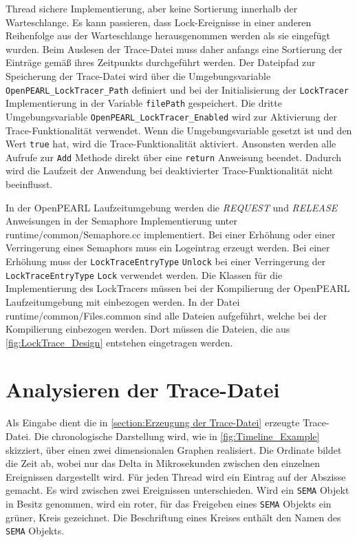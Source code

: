 Thread sichere Implementierung, aber keine Sortierung innerhalb der
Warteschlange. Es kann passieren, dass Lock-Ereignisse in einer anderen
Reihenfolge aus der Warteschlange herausgenommen werden als sie eingefügt
wurden. Beim Auslesen der Trace-Datei muss daher anfangs eine Sortierung der
Einträge gemäß ihres Zeitpunkts durchgeführt werden. Der Dateipfad zur
Speicherung der Trace-Datei wird über die Umgebungsvariable
\texttt{OpenPEARL\_LockTracer\_Path} definiert und bei der Initialisierung der
\texttt{LockTracer} Implementierung in der Variable \texttt{filePath}
gespeichert. Die dritte Umgebungsvariable
\texttt{OpenPEARL\_LockTracer\_Enabled} wird zur Aktivierung der
Trace-Funktionalität verwendet. Wenn die Umgebungsvariable gesetzt ist und den
Wert \texttt{true} hat, wird die Trace-Funktionalität aktiviert. Ansonsten
werden alle Aufrufe zur \texttt{Add} Methode direkt über eine \texttt{return}
Anweisung beendet. Dadurch wird die Laufzeit der Anwendung bei deaktivierter
Trace-Funktionalität nicht beeinflusst.

In der OpenPEARL Laufzeitumgebung werden die \textit{REQUEST} und
\textit{RELEASE} Anweisungen in der Semaphore Implementierung unter
runtime/common/Semaphore.cc implementiert. Bei einer Erhöhung oder einer
Verringerung eines Semaphors muss ein Logeintrag erzeugt werden. Bei einer
Erhöhung muss der \texttt{LockTraceEntryType} \texttt{Unlock} bei einer
Verringerung der \texttt{LockTraceEntryType} \texttt{Lock} verwendet werden. Die
Klassen für die Implementierung des LockTracers müssen bei der Kompilierung der
OpenPEARL Laufzeitumgebung mit einbezogen werden. In der Datei
runtime/common/Files.common sind alle Dateien aufgeführt, welche bei der
Kompilierung einbezogen werden. Dort müssen die Dateien, die aus
\cref{fig:LockTrace_Design} entstehen eingetragen werden.

\section{Analysieren der Trace-Datei}
\label{section:Analysieren der Trace-Datei}
Als Eingabe dient die in \cref{section:Erzeugung der Trace-Datei} erzeugte
Trace-Datei. Die chronologische Darstellung wird, wie in
\cref{fig:Timeline_Example} skizziert, über einen zwei dimensionalen Graphen
realisiert. Die Ordinate bildet die Zeit ab, wobei nur das Delta in
Mikrosekunden zwischen den einzelnen Ereignissen dargestellt wird. Für jeden
Thread wird ein Eintrag auf der Abszisse gemacht. Es wird zwischen zwei
Ereignissen unterschieden. Wird ein \texttt{SEMA} Objekt in Besitz genommen,
wird ein roter, für das Freigeben eines \texttt{SEMA} Objekts ein grüner, Kreis
gezeichnet. Die Beschriftung eines Kreises enthält den Namen des \texttt{SEMA}
Objekts.

